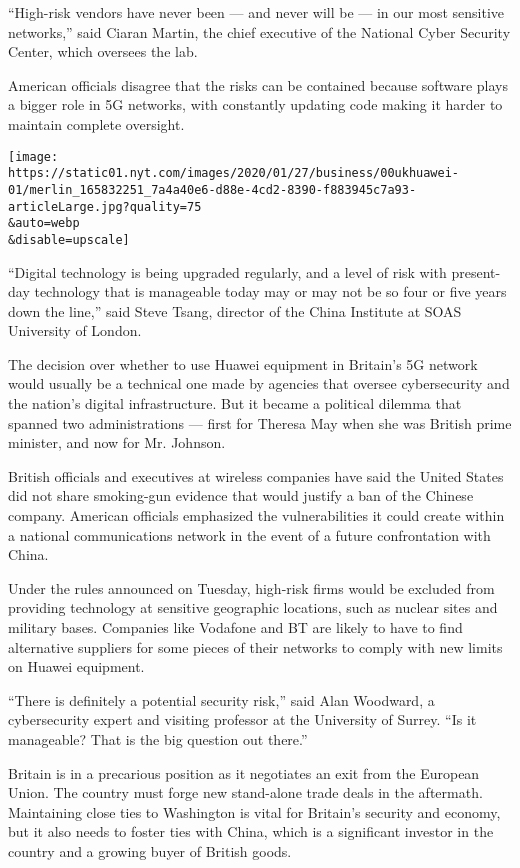 ``High-risk vendors have never been --- and never will be --- in our
most sensitive networks,'' said Ciaran Martin, the chief executive of
the National Cyber Security Center, which oversees the lab.

American officials disagree that the risks can be contained because
software plays a bigger role in 5G networks, with constantly updating
code making it harder to maintain complete oversight.

\texttt{[image: https://static01.nyt.com/images/2020/01/27/business/00ukhuawei-01/merlin\_165832251\_7a4a40e6-d88e-4cd2-8390-f883945c7a93-articleLarge.jpg?quality=75\\\&auto=webp\\\&disable=upscale]}

``Digital technology is being upgraded regularly, and a level of risk
with present-day technology that is manageable today may or may not be
so four or five years down the line,'' said Steve Tsang, director of the
China Institute at SOAS University of London.

The decision over whether to use Huawei equipment in Britain's 5G
network would usually be a technical one made by agencies that oversee
cybersecurity and the nation's digital infrastructure. But it became a
political dilemma that spanned two administrations --- first for Theresa
May when she was British prime minister, and now for Mr. Johnson.

British officials and executives at wireless companies have said the
United States did not share smoking-gun evidence that would justify a
ban of the Chinese company. American officials emphasized the
vulnerabilities it could create within a national communications network
in the event of a future confrontation with China.

Under the rules announced on Tuesday, high-risk firms would be excluded
from providing technology at sensitive geographic locations, such as
nuclear sites and military bases. Companies like Vodafone and BT are
likely to have to find alternative suppliers for some pieces of their
networks to comply with new limits on Huawei equipment.

``There is definitely a potential security risk,'' said Alan Woodward, a
cybersecurity expert and visiting professor at the University of Surrey.
``Is it manageable? That is the big question out there.''

Britain is in a precarious position as it negotiates an exit from the
European Union. The country must forge new stand-alone trade deals in
the aftermath. Maintaining close ties to Washington is vital for
Britain's security and economy, but it also needs to foster ties with
China, which is a significant investor in the country and a growing
buyer of British goods.


